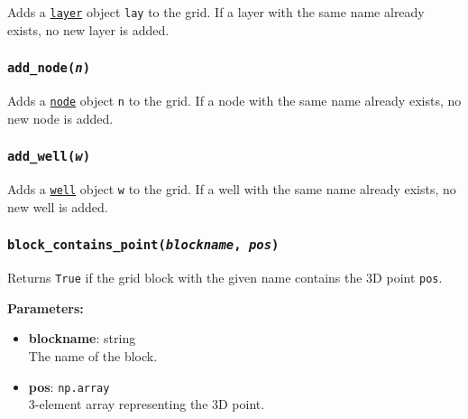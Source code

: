 Adds a \hyperref[layerobjects]{\texttt{layer}} object \texttt{lay} to
the grid. If a layer with the same name already exists, no new layer
is added.

\begin{snugshade}\subsubsection{\texttt{add\_node(\emph{n})}}\end{snugshade}
\label{sec:mulgrid:add_node}

Adds a \hyperref[nodeobjects]{\texttt{node}} object \texttt{n} to the
grid. If a node with the same name already exists, no new node is
added.

\begin{snugshade}\subsubsection{\texttt{add\_well(\emph{w})}}\end{snugshade}
\label{sec:mulgrid:add_well}

Adds a \hyperref[wellobjects]{\texttt{well}} object \texttt{w} to the
grid. If a well with the same name already exists, no new well is
added.

\begin{snugshade}\subsubsection{\texttt{block\_contains\_point(\emph{blockname}, \emph{pos})}}\end{snugshade}
\label{sec:mulgrid:block_contains_point}

Returns \texttt{True} if the grid block with the given name contains the 3D point \texttt{pos}.

\textbf{Parameters:}
\begin{itemize}
\item \textbf{blockname}: string\\
  The name of the block.
\item \textbf{pos}: \texttt{np.array}\\
  3-element array representing the 3D point.
\end{itemize}

